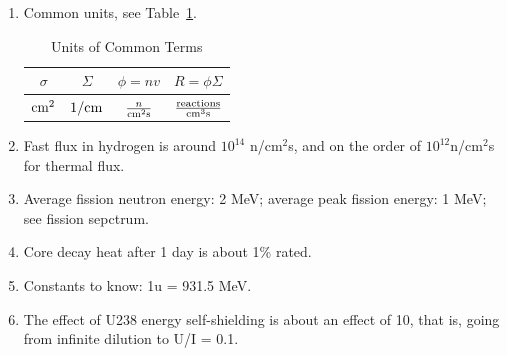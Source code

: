 \documentclass{school-22.211-notes}
\begin{document}
\clearpage
\begin{enumerate}
\item Common units, see Table~\ref{units}.
\begin{table}
  \centering
  \begin{tabular}{|c|c|c|c|} \hline
   $\sigma$ & $\Sigma$ & $\phi = nv$ & $R = \phi \Sigma$  \\ \hline
   $\mathrm{cm}^2$ & $1/\mathrm{cm}$ & $\frac{n}{\mathrm{cm}^2 \mathrm{s}}$ & $\frac{\mathrm{reactions}}{\mathrm{cm}^3 \mathrm{s}}$ \\ \hline
  \end{tabular}
  \caption{Units of Common Terms} \label{units}
\end{table}
\item Fast flux in hydrogen is around $10^{14}$ n/cm$^2$s, and on the order of $10^{12}$n/cm$^2$s for thermal flux. 
\item Average fission neutron energy: 2 MeV; average peak fission energy: 1 MeV; see fission sepctrum. 
\item Core decay heat after 1 day is about 1\% rated. 
\item Constants to know: 1u = 931.5 MeV. 
\item The effect of U238 energy self-shielding is about an effect of 10, that is, going from infinite dilution to U/I = 0.1. 
\end{enumerate}
\end{document}
